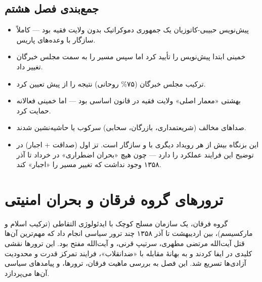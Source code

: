 \section{جمع‌بندی فصل هشتم}

\begin{principleBox}
\begin{itemize}[label=\textcolor{cPrimary}{$\blacksquare$}, rightmargin=2em]
    \item پیش‌نویس حبیبی-کاتوزیان یک جمهوری دموکراتیک بدون ولایت فقیه بود — کاملاً سازگار با وعده‌های پاریس.
    \item خمینی ابتدا پیش‌نویس را تأیید کرد اما سپس مسیر را به سمت مجلس خبرگان تغییر داد.
    \item ترکیب مجلس خبرگان (۷۵\% روحانی) نتیجه را از پیش تعیین کرد.
    \item بهشتی «معمار اصلی» ولایت فقیه در قانون اساسی بود — اما خمینی فعالانه حمایت کرد.
    \item صداهای مخالف (شریعتمداری، بازرگان، سحابی) سرکوب یا حاشیه‌نشین شدند.
    \item {} این بزنگاه بیش از هر رویداد دیگری با  و  سازگار است. تز اول (صداقت + اجبار) در توضیح این فرایند  عملکرد را دارد — چون هیچ «بحران اضطراری» در خرداد تا آذر ۱۳۵۸ وجود نداشت که تغییر مسیر را «اجبار» کند.
\end{itemize}
\end{principleBox}


\chapter{ترورهای گروه فرقان و بحران امنیتی}

\begin{infoBox}
گروه فرقان، یک سازمان مسلح کوچک با ایدئولوژی التقاطی (ترکیب اسلام و مارکسیسم)، بین اردیبهشت تا آذر ۱۳۵۸ چند ترور سیاسی انجام داد که مهم‌ترین آن‌ها قتل آیت‌الله مرتضی مطهری، سرتیپ قرنی، و آیت‌الله مفتح بود. این ترورها نقشی کلیدی در  ایفا کردند و به بهانهٔ مقابله با «ضدانقلاب»، فرایند تمرکز قدرت و محدودیت آزادی‌ها تسریع شد. این فصل به بررسی ماهیت فرقان، ترورها، و پیامدهای سیاسی آن‌ها می‌پردازد.
\end{infoBox}


